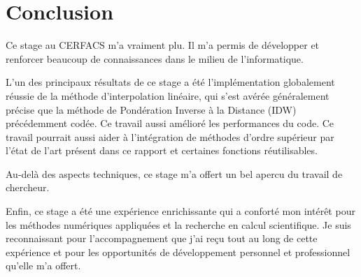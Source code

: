 \chapter*{Conclusion}


Ce stage au CERFACS m'a vraiment plu. Il m'a permis de développer et renforcer beaucoup de connaissances dans le milieu de l'informatique.

L'un des principaux résultats de ce stage a été l'implémentation globalement réussie de la méthode d'interpolation linéaire, qui s'est avérée généralement précise que la méthode de Pondération Inverse à la Distance (IDW) précédemment codée. Ce travail aussi amélioré les performances du code. Ce travail pourrait aussi aider à l'intégration de méthodes d'ordre supérieur par l'état de l'art présent dans ce rapport et certaines fonctions réutilisables.

Au-delà des aspects techniques, ce stage m'a offert un bel apercu du travail de chercheur.

Enfin, ce stage a été une expérience enrichissante qui a conforté mon intérêt pour les méthodes numériques appliquées et la recherche en calcul scientifique. Je suis reconnaissant pour l'accompagnement que j'ai reçu tout au long de cette expérience et pour les opportunités de développement personnel et professionnel qu'elle m'a offert.
